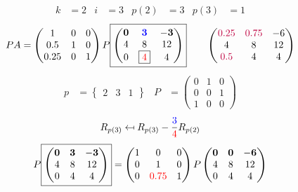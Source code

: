 \documentclass[pdf]{beamer}
\begin{document}
\begin{frame}{}\begin{align*} k &= 2 & i &= 3 & p(2) &= 3 & p(3) &= 1\end{align*} $$PA=\begin{pmatrix}1&0&0\\0.5&1&0\\0.25&0&1\end{pmatrix} P \boxed{\begin{pmatrix}\mathbf{0}&\mathbf{{\color{blue}3}}&\mathbf{-3}\\4&8&12\\0&\boxed{{\color{red}4}}&4\end{pmatrix}} \quad\quad \begin{pmatrix}{\color{purple}0.25}&{\color{purple}0.75}&-6\\4&8&12\\{\color{purple}0.5}&4&4\end{pmatrix}$$ \begin{align*} p&= \begin{Bmatrix}2&3&1\end{Bmatrix} & P&= \begin{pmatrix}0&1&0\\0&0&1\\1&0&0\end{pmatrix} \end{align*} $$R_{p(3)} \mapsfrom R_{p(3)} - \frac{{\color{blue}3}}{{\color{red}4}} R_{p(2)}$$ $$ P \boxed{\begin{pmatrix}\mathbf{0}&\mathbf{3}&\mathbf{-3}\\4&8&12\\0&4&4\end{pmatrix}} = \begin{pmatrix}1&0&0\\0&1&0\\0&{\color{red}0.75}&1\end{pmatrix} P \begin{pmatrix}\mathbf{0}&\mathbf{0}&\mathbf{-6}\\4&8&12\\0&4&4\end{pmatrix} $$\end{frame}
\end{document}
